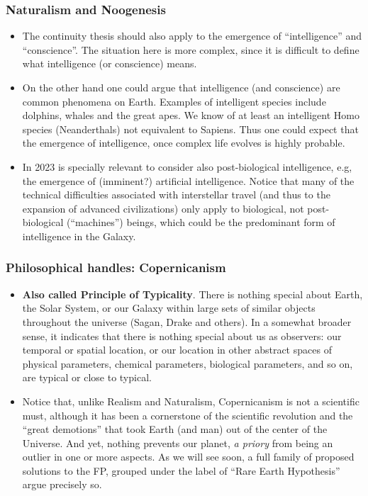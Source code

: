 \begin{frame}
\frametitle{Naturalism and Noogenesis}

\begin{itemize}
\item The continuity thesis should also apply to the emergence of ``intelligence'' and ``conscience''. The situation here is more complex, since it is difficult to define what intelligence (or conscience) means.
\item On the other hand one could argue that intelligence (and conscience) are common phenomena on Earth. Examples of intelligent species include dolphins, whales and the great apes. We know of at least an intelligent Homo species (Neanderthals) not equivalent to Sapiens. Thus one could expect that the emergence of intelligence, once complex life evolves is highly probable.  
\item In 2023 is specially relevant to consider also post-biological intelligence, e.g, the emergence of (imminent?)  artificial intelligence.  Notice that many of the technical difficulties associated with interstellar travel (and thus to the expansion of advanced civilizations) only apply to biological, not post-biological (``machines'') beings, which could be the predominant form of intelligence in the Galaxy. 
\end{itemize}
\end{frame}

\begin{frame}
\frametitle{Philosophical handles: Copernicanism}
\begin{itemize}
\item {\bf Also called Principle of Typicality}. There is nothing special about Earth, the Solar System, or our Galaxy within large sets of similar objects throughout the universe (Sagan, Drake and others). In a somewhat broader sense, it indicates that there is nothing special about us as observers: our temporal or spatial location, or our location in other abstract spaces of physical parameters, chemical parameters, biological parameters, and so on, are typical or close to typical. 
\item Notice that, unlike Realism and Naturalism, Copernicanism is not a scientific must, although it has been a cornerstone of the scientific revolution and the ``great demotions'' that took Earth (and man) out of the center of the Universe. And yet, nothing prevents our planet, {\em a priory} from being an outlier in one or more aspects. As we will see soon, a full family of proposed solutions to the FP, grouped under the label of ``Rare Earth Hypothesis'' argue precisely so. 
\end{itemize}

\end{frame}

